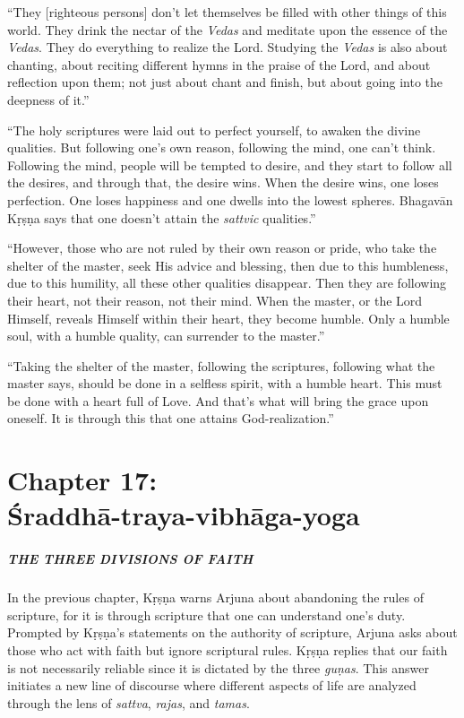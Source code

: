\documentclass[12pt, twoside, openright]{memoir}
\begin{document}
\enquote{They [righteous persons] don’t let themselves be filled with other things of this world. They drink the nectar of the \textit{Vedas} and meditate upon the essence of the \textit{Vedas}. They do everything to realize the Lord. Studying the \textit{Vedas} is also about chanting, about reciting different hymns in the praise of the Lord, and about reflection upon them; not just about chant and finish, but about going into the deepness of it.}

\enquote{The holy scriptures were laid out to perfect yourself, to awaken the divine qualities. But following one’s own reason, following the mind, one can’t think. Following the mind, people will be tempted to desire, and they start to follow all the desires, and through that, the desire wins. When the desire wins, one loses perfection. One loses happiness and one dwells into the lowest spheres. Bhagavān Kṛṣṇa says that one doesn’t attain the \textit{sattvic} qualities.}

\enquote{However, those who are not ruled by their own reason or pride, who take the shelter of the master, seek His advice and blessing, then due to this humbleness, due to this humility, all these other qualities disappear. Then they are following their heart, not their reason, not their mind. When the master, or the Lord Himself, reveals Himself within their heart, they become humble. Only a humble soul, with a humble quality, can surrender to the master.}

\enquote{Taking the shelter of the master, following the scriptures, following what the master says, should be done in a selfless spirit, with a humble heart. This must be done with a heart full of Love. And that’s what will bring the grace upon oneself. It is through this that one attains God-realization.}
 \chapter{Chapter 17: \\Śraddhā-traya-vibhāga-yoga}\label{chap-sraddha-traya-vibhaga-yoga}

\paragraph*{\MakeUppercase{The Three Divisions of Faith}}


\noindent In the previous chapter, Kṛṣṇa warns Arjuna about abandoning the rules of scripture, for it is through scripture that one can understand one’s duty. Prompted by Kṛṣṇa's statements on the authority of scripture, Arjuna asks about those who act with faith but ignore scriptural rules. Kṛṣṇa replies that our faith is not necessarily reliable since it is dictated by the three \textit{guṇas}. This answer initiates a new line of discourse where different aspects of life are analyzed through the lens of \textit{sattva}, \textit{rajas}, and \textit{tamas}.
\end{document}
